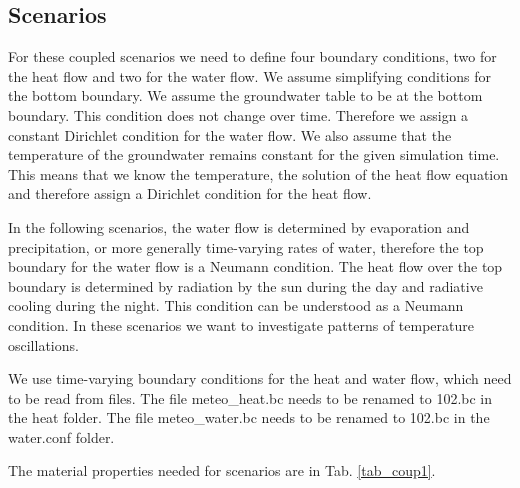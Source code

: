 \newpage
\subsection{Scenarios}

For these coupled scenarios we need to define four boundary conditions, two for the heat flow and two for the water flow. We assume simplifying conditions for the bottom boundary. We assume the groundwater table to be at the bottom boundary. This condition does not change over time. Therefore we assign a constant Dirichlet condition for the water flow. We also assume that the temperature of the groundwater remains constant for the given simulation time. This means that we know the temperature, the solution of the heat flow equation and therefore assign a Dirichlet condition for the heat flow. 

In the following scenarios, the water flow is determined by evaporation and precipitation, or more generally time-varying rates of water, therefore the top boundary for the water flow is a Neumann condition. The heat flow over the top boundary is determined by radiation by the sun during the day and radiative cooling during the night. This condition can be understood as a Neumann condition. In these scenarios we want to investigate patterns of temperature oscillations.

We use time-varying boundary conditions for the heat and water flow, which need to be read from files. The file meteo\_heat.bc needs to be renamed to 102.bc in the heat folder. The file meteo\_water.bc needs to be renamed to 102.bc in the water.conf folder.

The material properties needed for scenarios are in Tab. \ref{tab_coup1}.
 
